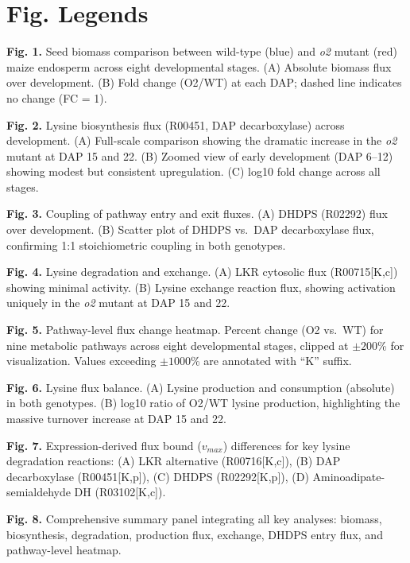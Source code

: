 \documentclass[12pt,a4paper]{article}
\begin{document}
\newpage
\section*{Fig. Legends}

\textbf{Fig. 1.} Seed biomass comparison between wild-type (blue) and \textit{o2} mutant (red) maize endosperm across eight developmental stages. (A) Absolute biomass flux over development. (B) Fold change (O2/WT) at each DAP; dashed line indicates no change (FC = 1).

\textbf{Fig. 2.} Lysine biosynthesis flux (R00451, DAP decarboxylase) across development. (A) Full-scale comparison showing the dramatic increase in the \textit{o2} mutant at DAP 15 and 22. (B) Zoomed view of early development (DAP 6--12) showing modest but consistent upregulation. (C) log10 fold change across all stages.

\textbf{Fig. 3.} Coupling of pathway entry and exit fluxes. (A) DHDPS (R02292) flux over development. (B) Scatter plot of DHDPS vs.\ DAP decarboxylase flux, confirming 1:1 stoichiometric coupling in both genotypes.

\textbf{Fig. 4.} Lysine degradation and exchange. (A) LKR cytosolic flux (R00715[K,c]) showing minimal activity. (B) Lysine exchange reaction flux, showing activation uniquely in the \textit{o2} mutant at DAP 15 and 22.

\textbf{Fig. 5.} Pathway-level flux change heatmap. Percent change (O2 vs.\ WT) for nine metabolic pathways across eight developmental stages, clipped at $\pm 200$\% for visualization. Values exceeding $\pm 1000$\% are annotated with ``K'' suffix.

\textbf{Fig. 6.} Lysine flux balance. (A) Lysine production and consumption (absolute) in both genotypes. (B) log10 ratio of O2/WT lysine production, highlighting the massive turnover increase at DAP 15 and 22.

\textbf{Fig. 7.} Expression-derived flux bound ($v_{max}$) differences for key lysine degradation reactions: (A) LKR alternative (R00716[K,c]), (B) DAP decarboxylase (R00451[K,p]), (C) DHDPS (R02292[K,p]), (D) Aminoadipate-semialdehyde DH (R03102[K,c]).

\textbf{Fig. 8.} Comprehensive summary panel integrating all key analyses: biomass, biosynthesis, degradation, production flux, exchange, DHDPS entry flux, and pathway-level heatmap.
\end{document}
